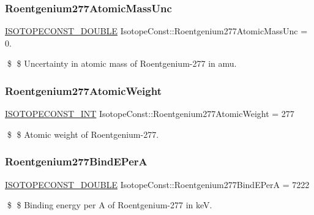 \subsubsection{\texorpdfstring{Roentgenium277\+Atomic\+Mass\+Unc}{Roentgenium277AtomicMassUnc}}
{\footnotesize\ttfamily \mbox{\hyperlink{group___isotope_const-_macros_ga8f45a7272ce02c0b4c65c44636ed719a}{I\+S\+O\+T\+O\+P\+E\+C\+O\+N\+S\+T\+\_\+\+D\+O\+U\+B\+LE}} Isotope\+Const\+::\+Roentgenium277\+Atomic\+Mass\+Unc = 0.}

\$ \$ Uncertainty in atomic mass of Roentgenium-\/277 in amu. \mbox{\label{group___isotope_const-_roentgenium-_rg277_gaeef2d40c71770aba21d7a8491880c309}} 
\subsubsection{\texorpdfstring{Roentgenium277\+Atomic\+Weight}{Roentgenium277AtomicWeight}}
{\footnotesize\ttfamily \mbox{\hyperlink{group___isotope_const-_macros_ga5f18360b3e99483a35c32d789e62621c}{I\+S\+O\+T\+O\+P\+E\+C\+O\+N\+S\+T\+\_\+\+I\+NT}} Isotope\+Const\+::\+Roentgenium277\+Atomic\+Weight = 277}

\$ \$ Atomic weight of Roentgenium-\/277. \mbox{\label{group___isotope_const-_roentgenium-_rg277_ga0e3295873be5c41bb2064925055c4dbf}} 
\subsubsection{\texorpdfstring{Roentgenium277\+Bind\+E\+PerA}{Roentgenium277BindEPerA}}
{\footnotesize\ttfamily \mbox{\hyperlink{group___isotope_const-_macros_ga8f45a7272ce02c0b4c65c44636ed719a}{I\+S\+O\+T\+O\+P\+E\+C\+O\+N\+S\+T\+\_\+\+D\+O\+U\+B\+LE}} Isotope\+Const\+::\+Roentgenium277\+Bind\+E\+PerA = 7222}

\$ \$ Binding energy per A of Roentgenium-\/277 in keV. \mbox{\label{group___isotope_const-_roentgenium-_rg277_ga4f8ec6851080041ef2ff75e4d7634146}} 
